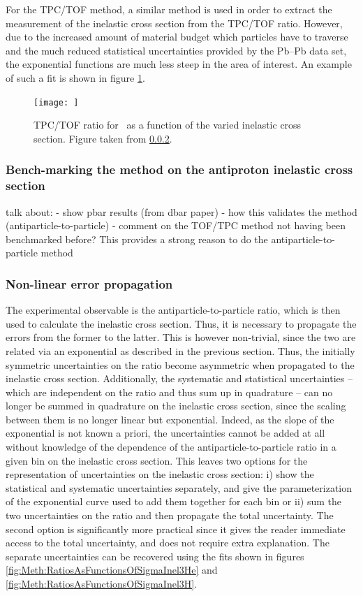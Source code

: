For the TPC/TOF method, a similar method is used in order to extract the measurement of the inelastic cross section from the TPC/TOF ratio. However, due to the increased amount of material budget which particles have to traverse and the much reduced statistical uncertainties provided by the Pb--Pb data set, the exponential functions are much less steep in the area of interest. An example of such a fit is shown in figure \ref{fig:TPCTOF_fit}. 

\begin{figure}[bthp]
    \centering
    \texttt{[image: ]}
    \caption{TPC/TOF ratio for \ahe\ as a function of the varied inelastic cross section. Figure taken from \ref{}.}
    \label{fig:TPCTOF_fit}
\end{figure}
\subsubsection{Bench-marking the method on the antiproton inelastic cross section}
talk about: 
 - show pbar results (from dbar paper)
 - how this validates the method (antiparticle-to-particle)
 - comment on the TOF/TPC method not having been benchmarked before? This provides a strong reason to do the antiparticle-to-particle method
\subsubsection{Non-linear error propagation}
The experimental observable is the antiparticle-to-particle ratio, which is then used to calculate the inelastic cross section. Thus, it is necessary to propagate the errors from the former to the latter. This is however non-trivial, since the two are related via an exponential as described in the previous section. Thus, the initially symmetric uncertainties on the ratio become asymmetric when propagated to the inelastic cross section. Additionally, the systematic and statistical uncertainties -- which are independent on the ratio and thus sum up in quadrature -- can no longer be summed in quadrature on the inelastic cross section, since the scaling between them is no longer linear but exponential. Indeed, as the slope of the exponential is not known a priori, the uncertainties cannot be added at all without knowledge of the dependence of the antiparticle-to-particle ratio in a given bin on the inelastic cross section. This leaves two options for the representation of uncertainties on the inelastic cross section: i) show the statistical and systematic uncertainties separately, and give the parameterization of the exponential curve used to add them together for each bin or ii) sum the two uncertainties on the ratio and then propagate the total uncertainty. The second option is significantly more practical since it gives the reader immediate access to the total uncertainty, and does not require extra explanation. The separate uncertainties can be recovered using the fits shown in figures \ref{fig:Meth:RatiosAsFunctionsOfSigmaInel3He} and \ref{fig:Meth:RatiosAsFunctionsOfSigmaInel3H}. \\


